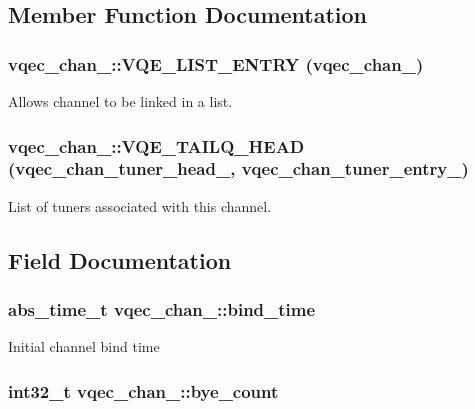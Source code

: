 \subsection{Member Function Documentation}
\subsubsection{\setlength{\rightskip}{0pt plus 5cm}vqec\_\-chan\_\-::VQE\_\-LIST\_\-ENTRY (\bf{vqec\_\-chan\_\-})}\label{structvqec__chan___3ce61ec45f6f0fadfc55bf696aeab723}


Allows channel to be linked in a list. 
\subsubsection{\setlength{\rightskip}{0pt plus 5cm}vqec\_\-chan\_\-::VQE\_\-TAILQ\_\-HEAD (vqec\_\-chan\_\-tuner\_\-head\_\-, \bf{vqec\_\-chan\_\-tuner\_\-entry\_\-})}\label{structvqec__chan___c476c7506ef132aa0f51e7e5b79286e5}


List of tuners associated with this channel. 

\subsection{Field Documentation}
\subsubsection{\setlength{\rightskip}{0pt plus 5cm}abs\_\-time\_\-t \bf{vqec\_\-chan\_\-::bind\_\-time}}\label{structvqec__chan___ba51fbd54c0e3170d9316dae8070e565}


Initial channel bind time 
\subsubsection{\setlength{\rightskip}{0pt plus 5cm}int32\_\-t \bf{vqec\_\-chan\_\-::bye\_\-count}}\label{structvqec__chan___1104308f5603bb73c185be1cc43187fd}


